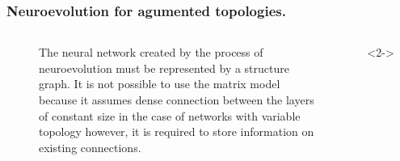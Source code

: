 \documentclass{beamer}
\begin{document}
\begin{frame}
\frametitle{Neuroevolution for agumented topologies.}
\begin{columns}[T,onlytextwidth]
        \begin{column}{.4\textwidth}
            \begin{minipage}{\textwidth}
                \begin{figure}
	The neural network created by the process of neuroevolution must be represented by a structure
	graph.
	It is not possible to use the matrix model because it assumes dense connection between the 
	layers of constant size in the case of networks with variable topology however, it is required 
	to store information on existing connections.
                \end{figure}
            \end{minipage}
        \end{column}
        \begin{column}{.4\textwidth}
            \begin{onlyenv}<2->
                \begin{minipage}{\textwidth}
                    \begin{figure}
                        \includegraphics[width=\textwidth]{figures/graph_xor}

\end{figure}
\end{minipage}
\end{onlyenv}
\end{column}
\end{columns}
\end{frame}
\end{document}
